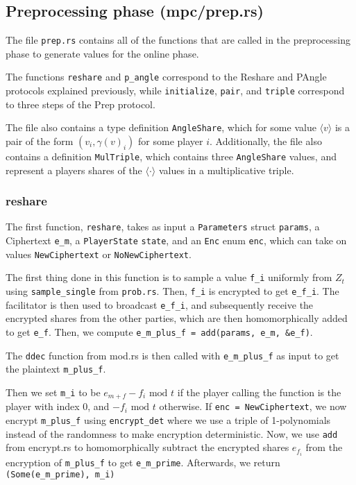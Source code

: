 \documentclass[../main.tex]{subfiles}
\begin{document}
\subsection{Preprocessing phase (mpc/prep.rs)}
The file \lstinline{prep.rs} contains all of the functions that are called in the preprocessing phase to generate values for the online phase.

The functions \lstinline{reshare} and \lstinline{p_angle} correspond to the Reshare and PAngle protocols explained previously, while \lstinline{initialize}, \lstinline{pair}, and \lstinline{triple} correspond to three steps of the Prep protocol.

The file also contains a type definition \lstinline{AngleShare}, which for some value $\langle v \rangle$ is a pair of the form $(v_i, \gamma(v)_i)$ for some player $i$. Additionally, the file also contains a definition \lstinline{MulTriple}, which contains three \lstinline{AngleShare} values, and represent a players shares of the $\langle \cdot \rangle$ values in a multiplicative triple. %

\subsubsection{reshare}
The first function, \lstinline{reshare}, takes as input a \lstinline{Parameters} struct \lstinline{params}, a Ciphertext \lstinline{e_m}, a  \lstinline{PlayerState} \lstinline{state}, and an \lstinline{Enc} enum \lstinline{enc}, which can take on values \lstinline{NewCiphertext} or \lstinline{NoNewCiphertext}.

The first thing done in this function is to sample a value \lstinline{f_i} uniformly from $Z_t$ using \lstinline{sample_single} from \lstinline{prob.rs}. Then, \lstinline{f_i} is encrypted to get \lstinline{e_f_i}.
The facilitator is then used to broadcast \lstinline{e_f_i}, and subsequently receive the encrypted shares from the other parties, which are then homomorphically added to get \lstinline{e_f}. Then, we compute \lstinline{e_m_plus_f = add(params, e_m, &e_f)}.

The \lstinline{ddec} function from mod.rs is then called with \lstinline{e_m_plus_f} as input to get the plaintext \lstinline{m_plus_f}.

Then we set \lstinline{m_i} to be $e_{m + f} - f_i \text{ mod } t$ if the player calling the function is the player with index $0$, and $- f_i \text{ mod } t$ otherwise. If \lstinline{enc = NewCiphertext}, we now encrypt \lstinline{m_plus_f} using \lstinline{encrypt_det} where we use a triple of 1-polynomials instead of the randomness to make encryption deterministic. Now, we use \lstinline{add} from encrypt.rs to homomorphically subtract the encrypted shares $e_{f_i}$ from the encryption of \lstinline{m_plus_f} to get \lstinline{e_m_prime}. Afterwards, we return \lstinline{(Some(e_m_prime), m_i)}
\end{document}
